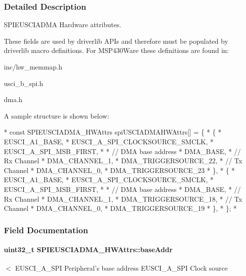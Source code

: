 \subsubsection{Detailed Description}
S\-P\-I\-E\-U\-S\-C\-I\-A\-D\-M\-A Hardware attributes. 

These fields are used by driverlib A\-P\-Is and therefore must be populated by driverlib macro definitions. For M\-S\-P430\-Ware these definitions are found in\-:
\begin{DoxyItemize}
\item inc/hw\-\_\-memmap.\-h
\item usci\-\_\-b\-\_\-spi.\-h
\item dma.\-h
\end{DoxyItemize}

A sample structure is shown below\-: 
\begin{DoxyCode}
*  \textcolor{keyword}{const} SPIEUSCIADMA_HWAttrs spiUSCIADMAHWAttrs[] = \{
*      \{
*          EUSCI\_A1\_BASE,
*          EUSCI\_A\_SPI\_CLOCKSOURCE\_SMCLK,
*          EUSCI\_A\_SPI\_MSB\_FIRST,
*
*          \textcolor{comment}{// DMA base address}
*          DMA\_BASE,
*          \textcolor{comment}{// Rx Channel}
*          DMA\_CHANNEL\_1,
*          DMA\_TRIGGERSOURCE\_22,
*          \textcolor{comment}{// Tx Channel}
*          DMA\_CHANNEL\_0,
*          DMA\_TRIGGERSOURCE\_23
*      \},
*      \{
*          EUSCI\_A1\_BASE,
*          EUSCI\_A\_SPI\_CLOCKSOURCE\_SMCLK,
*          EUSCI\_A\_SPI\_MSB\_FIRST,
*
*          \textcolor{comment}{// DMA base address}
*          DMA\_BASE,
*          \textcolor{comment}{// Rx Channel}
*          DMA\_CHANNEL\_1,
*          DMA\_TRIGGERSOURCE\_18,
*          \textcolor{comment}{// Tx Channel}
*          DMA\_CHANNEL\_0,
*          DMA\_TRIGGERSOURCE\_19
*      \},
*  \};
*  
\end{DoxyCode}
 

\subsubsection{Field Documentation}
\paragraph[{base\-Addr}]{\setlength{\rightskip}{0pt plus 5cm}uint32\-\_\-t S\-P\-I\-E\-U\-S\-C\-I\-A\-D\-M\-A\-\_\-\-H\-W\-Attrs\-::base\-Addr}\label{struct_s_p_i_e_u_s_c_i_a_d_m_a___h_w_attrs_a2d0c61d4d3b6d0bc7be6c8099777218b}
$<$ E\-U\-S\-C\-I\-\_\-\-A\-\_\-\-S\-P\-I Peripheral's base address E\-U\-S\-C\-I\-\_\-\-A\-\_\-\-S\-P\-I Clock source 
